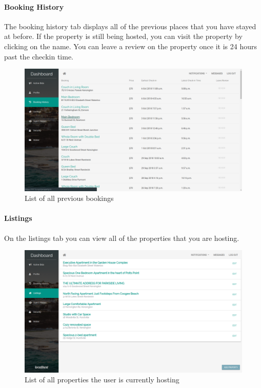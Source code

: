 \paragraph{Booking History}
The booking history tab displays all of the previous places that you have stayed
at before. If the property is still being hosted, you can visit the property by
clicking on the name.
You can leave a review on the property once it is 24 hours past the checkin time.
\begin{figure}[!h]
  \includegraphics[width=\linewidth]{assets/userManual/bookingHistory.png}
  \caption{List of all previous bookings}
  \label{fig:bookingHistory}
\end{figure}

\paragraph{Listings}
On the listings tab you can view all of the properties that you are hosting.
\begin{figure}[!h]
  \includegraphics[width=\linewidth]{assets/userManual/listings.png}
  \caption{List of all properties the user is currently hosting}
  \label{fig:listings}
\end{figure}


